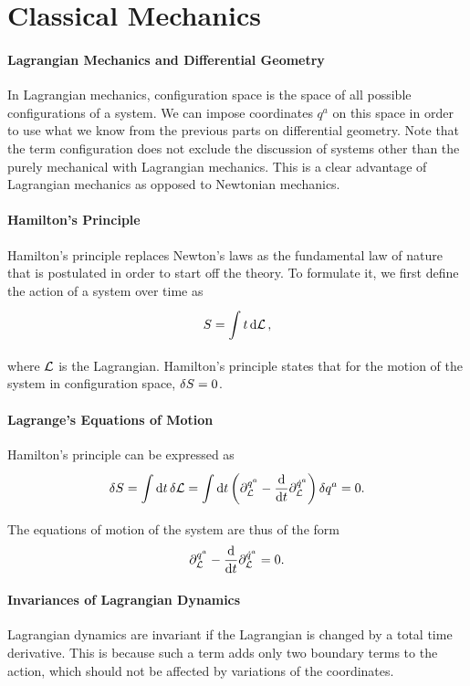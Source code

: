 \section{Classical Mechanics}

\paragraph{Lagrangian Mechanics and Differential Geometry}
In Lagrangian mechanics, configuration space is the space of all possible configurations of a system. We can impose coordinates $q^{a}$ on this space in order to use what we know from the previous parts on differential geometry. Note that the term configuration does not exclude the discussion of systems other than the purely mechanical with Lagrangian mechanics. This is a clear advantage of Lagrangian mechanics as opposed to Newtonian mechanics.

\paragraph{Hamilton's Principle}
Hamilton's principle replaces Newton's laws as the fundamental law of nature that is postulated in order to start off the theory. To formulate it, we first define the action of a system over time as
\begin{align*}
	S = \int\limits_{}^{}{t}\dd{\ensuremath{\mathcal{L}}},
\end{align*}
where $\mathcal{L}$ is the Lagrangian. Hamilton's principle states that for the motion of the system in configuration space, $\var{S} = 0$.

\paragraph{Lagrange's Equations of Motion}
Hamilton's principle can be expressed as
\begin{align*}
	\var{S} = \int\limits_{}^{}\dd{t}{\var{\ensuremath{\mathcal{L}}}} = \int\limits_{}^{}\dd{t}{\left(\ensuremath{\partial^{q^{a}}_{\mathcal{L}}} - \dv{t}\ensuremath{\partial^{\dot{q}^{a}}_{\mathcal{L}}}\right)\var{q^{a}}} = 0.
\end{align*}
The equations of motion of the system are thus of the form
\begin{align*}
	\partial^{q^{a}}_{\mathcal{L}} - \dv{t}\partial^{\dot{q}^{a}}_{\mathcal{L}} = 0.
\end{align*}

\paragraph{Invariances of Lagrangian Dynamics}
Lagrangian dynamics are invariant if the Lagrangian is changed by a total time derivative. This is because such a term adds only two boundary terms to the action, which should not be affected by variations of the coordinates.


